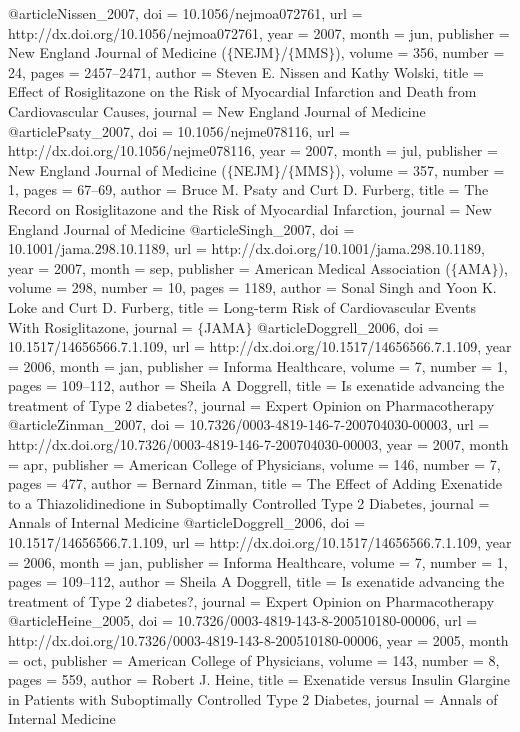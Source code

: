 @article{Nissen_2007,
	doi = {10.1056/nejmoa072761},
	url = {http://dx.doi.org/10.1056/nejmoa072761},
	year = 2007,
	month = {jun},
	publisher = {New England Journal of Medicine ($\lbrace$NEJM$\rbrace$/$\lbrace$MMS$\rbrace$)},
	volume = {356},
	number = {24},
	pages = {2457--2471},
	author = {Steven E. Nissen and Kathy Wolski},
	title = {Effect of Rosiglitazone on the Risk of Myocardial Infarction and Death from Cardiovascular Causes},
	journal = {New England Journal of Medicine}
}
@article{Psaty_2007,
	doi = {10.1056/nejme078116},
	url = {http://dx.doi.org/10.1056/nejme078116},
	year = 2007,
	month = {jul},
	publisher = {New England Journal of Medicine ($\lbrace$NEJM$\rbrace$/$\lbrace$MMS$\rbrace$)},
	volume = {357},
	number = {1},
	pages = {67--69},
	author = {Bruce M. Psaty and Curt D. Furberg},
	title = {The Record on Rosiglitazone and the Risk of Myocardial Infarction},
	journal = {New England Journal of Medicine}
}
@article{Singh_2007,
	doi = {10.1001/jama.298.10.1189},
	url = {http://dx.doi.org/10.1001/jama.298.10.1189},
	year = 2007,
	month = {sep},
	publisher = {American Medical Association ($\lbrace$AMA$\rbrace$)},
	volume = {298},
	number = {10},
	pages = {1189},
	author = {Sonal Singh and Yoon K. Loke and Curt D. Furberg},
	title = {Long-term Risk of Cardiovascular Events With Rosiglitazone},
	journal = {$\lbrace$JAMA$\rbrace$}
}
@article{Doggrell_2006,
	doi = {10.1517/14656566.7.1.109},
	url = {http://dx.doi.org/10.1517/14656566.7.1.109},
	year = 2006,
	month = {jan},
	publisher = {Informa Healthcare},
	volume = {7},
	number = {1},
	pages = {109--112},
	author = {Sheila A Doggrell},
	title = {Is exenatide advancing the treatment of Type 2 diabetes?},
	journal = {Expert Opinion on Pharmacotherapy}
}
@article{Zinman_2007,
	doi = {10.7326/0003-4819-146-7-200704030-00003},
	url = {http://dx.doi.org/10.7326/0003-4819-146-7-200704030-00003},
	year = 2007,
	month = {apr},
	publisher = {American College of Physicians},
	volume = {146},
	number = {7},
	pages = {477},
	author = {Bernard Zinman},
	title = {The Effect of Adding Exenatide to a Thiazolidinedione in Suboptimally Controlled Type 2 Diabetes},
	journal = {Annals of Internal Medicine}
}
@article{Doggrell_2006,
	doi = {10.1517/14656566.7.1.109},
	url = {http://dx.doi.org/10.1517/14656566.7.1.109},
	year = 2006,
	month = {jan},
	publisher = {Informa Healthcare},
	volume = {7},
	number = {1},
	pages = {109--112},
	author = {Sheila A Doggrell},
	title = {Is exenatide advancing the treatment of Type 2 diabetes?},
	journal = {Expert Opinion on Pharmacotherapy}
}
@article{Heine_2005,
	doi = {10.7326/0003-4819-143-8-200510180-00006},
	url = {http://dx.doi.org/10.7326/0003-4819-143-8-200510180-00006},
	year = 2005,
	month = {oct},
	publisher = {American College of Physicians},
	volume = {143},
	number = {8},
	pages = {559},
	author = {Robert J. Heine},
	title = {Exenatide versus Insulin Glargine in Patients with Suboptimally Controlled Type 2 Diabetes},
	journal = {Annals of Internal Medicine}
}

